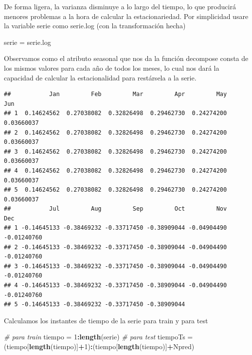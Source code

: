 \documentclass[]{article}
\newenvironment{Shaded}{\begin{snugshade}}{\end{snugshade}}
\newcommand{\KeywordTok}[1]{\textcolor[rgb]{0.13,0.29,0.53}{\textbf{#1}}}
\newcommand{\DecValTok}[1]{\textcolor[rgb]{0.00,0.00,0.81}{#1}}
\newcommand{\StringTok}[1]{\textcolor[rgb]{0.31,0.60,0.02}{#1}}
\newcommand{\CommentTok}[1]{\textcolor[rgb]{0.56,0.35,0.01}{\textit{#1}}}
\newcommand{\OperatorTok}[1]{\textcolor[rgb]{0.81,0.36,0.00}{\textbf{#1}}}
\newcommand{\NormalTok}[1]{#1}
\begin{document}
De forma ligera, la varianza disminuye a lo largo del tiempo, lo que
producirá menores problemas a la hora de calcular la estacionariedad.
Por simplicidad usare la variable serie como serie.log (con la
transformación hecha)

\begin{Shaded}
\begin{Highlighting}[]
\NormalTok{serie =}\StringTok{ }\NormalTok{serie.log}
\end{Highlighting}
\end{Shaded}

Observamos como el atributo seasonal que nos da la función decompose
consta de los mismos valores para cada año de todos los meses, lo cual
nos dará la capacidad de calcular la estacionalidad para restársela a la
serie.

\begin{Shaded}
\end{Shaded}

\begin{verbatim}
##           Jan         Feb         Mar         Apr         May         Jun
## 1  0.14624562  0.27038082  0.32826498  0.29462730  0.24274200  0.03660037
## 2  0.14624562  0.27038082  0.32826498  0.29462730  0.24274200  0.03660037
## 3  0.14624562  0.27038082  0.32826498  0.29462730  0.24274200  0.03660037
## 4  0.14624562  0.27038082  0.32826498  0.29462730  0.24274200  0.03660037
## 5  0.14624562  0.27038082  0.32826498  0.29462730  0.24274200  0.03660037
##           Jul         Aug         Sep         Oct         Nov         Dec
## 1 -0.14645133 -0.38469232 -0.33717450 -0.38909044 -0.04904490 -0.01240760
## 2 -0.14645133 -0.38469232 -0.33717450 -0.38909044 -0.04904490 -0.01240760
## 3 -0.14645133 -0.38469232 -0.33717450 -0.38909044 -0.04904490 -0.01240760
## 4 -0.14645133 -0.38469232 -0.33717450 -0.38909044 -0.04904490 -0.01240760
## 5 -0.14645133 -0.38469232 -0.33717450 -0.38909044
\end{verbatim}

Calculamos los instantes de tiempo de la serie para train y para test

\begin{Shaded}
\begin{Highlighting}[]
\CommentTok{# para train}
\NormalTok{tiempo =}\StringTok{ }\DecValTok{1}\OperatorTok{:}\KeywordTok{length}\NormalTok{(serie)}
\CommentTok{# para test}
\NormalTok{tiempoTs =}\StringTok{ }\NormalTok{(tiempo[}\KeywordTok{length}\NormalTok{(tiempo)]}\OperatorTok{+}\DecValTok{1}\NormalTok{)}\OperatorTok{:}\NormalTok{(tiempo[}\KeywordTok{length}\NormalTok{(tiempo)]}\OperatorTok{+}\NormalTok{Npred)}
\end{Highlighting}
\end{Shaded}
\end{document}
